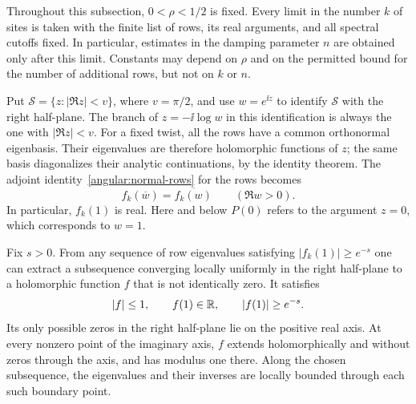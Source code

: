 Throughout this subsection, $0<\rho<1/2$ is fixed.  Every limit in the
number $k$ of sites is taken with the finite list of rows, its real
arguments, and all spectral cutoffs fixed.  In particular, estimates in
the damping parameter $n$ are obtained only after this limit.  Constants
may depend on $\rho$ and on the permitted bound for the number of
additional rows, but not on $k$ or $n$.

Put $\mathcal S=\{z:|\Re z|<v\}$, where $v=\pi/2$, and use
$w=e^{\ii z}$ to identify $\mathcal S$ with the right half-plane.  The
branch of $z=-\ii\log w$ in this identification is always the one with
$|\Re z|<v$.  For a fixed twist, all the rows have a common orthonormal
eigenbasis.  Their eigenvalues are therefore holomorphic functions of
$z$; the same basis diagonalizes their analytic continuations, by the
identity theorem.  The adjoint identity~\eqref{angular:normal-rows}
for the rows becomes
\begin{equation}\label{angular:eigenvalue-reflection}
 f_k(\overline w)=\overline{f_k(w)}
 \qquad (\Re w>0).
\end{equation}
In particular, $f_k(1)$ is real.  Here and below $P(0)$ refers to the
argument $z=0$, which corresponds to $w=1$.

\begin{lemma}\label{angular:edge-continuation}
Fix $s>0$.  From any sequence of row eigenvalues satisfying
$|f_k(1)|\ge e^{-s}$ one can extract a subsequence converging locally
uniformly in the right half-plane to a holomorphic function $f$ that
is not identically zero.  It satisfies
\[
 |f|\le1,\qquad f(1)\in\mathbb R,\qquad |f(1)|\ge e^{-s}.
\]
Its only possible zeros in the right half-plane lie on the positive
real axis.  At every nonzero point of the imaginary axis, $f$ extends
holomorphically and without zeros through the axis, and has modulus
one there.  Along the chosen subsequence, the eigenvalues and their
inverses are locally bounded through each such boundary point.
\end{lemma}

